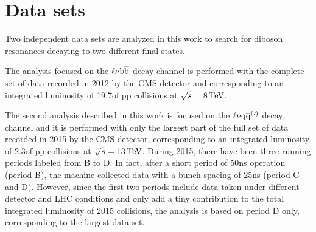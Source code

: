 
\section{Data sets}\label{sec:data set}

Two independent data sets are analyzed in this work to search for diboson resonances decaying to two different final states.

The analysis focused on the $\ell\nu{\mathrm{b}\overline{\mathrm{b}}}$ decay channel is performed with the complete set of data recorded in 2012 by the CMS detector
and corresponding to an integrated luminosity of 19.7\fbinv of pp collisions at $\sqrt{s} = 8\,\text{Te\hspace{-.08em}V}$.

The second analysis described in this work is focused on the $\ell\nu\mathrm{q}\overline{\mathrm{q}}^({}'^){}$ decay channel and it is performed with only the largest part of the full set of data recorded in 2015 by the CMS detector,
corresponding to an integrated luminosity of 2.3\fbinv of pp collisions at $\sqrt{s} = 13\,\text{Te\hspace{-.08em}V}$.
During 2015, there have been three running periods labeled from B to D. In fact, after a short period of 50\unit{ns} operation (period B), the machine collected data with a bunch spacing of 25\unit{ns} (period C and D).
However, since the first two periods include data taken under different detector and LHC conditions and only add a tiny contribution to the total integrated luminosity of 2015 collisions, the analysis is based on period D only, corresponding to the largest data set.

